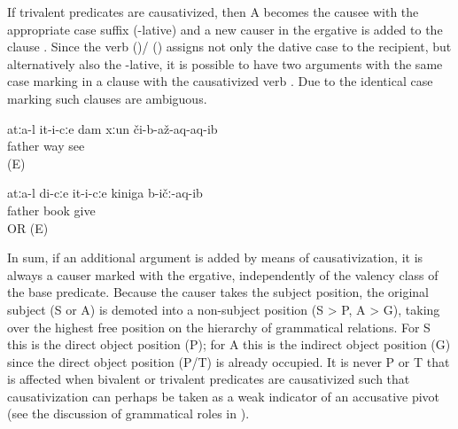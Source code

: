 If trivalent predicates are causativized, then A becomes the causee with the appropriate case suffix (-lative) and a new causer in the ergative is added to the clause . Since the verb  ()\slash{} ()  assigns not only the dative case to the recipient, but alternatively also the -lative, it is possible to have two arguments with the same case marking in a clause with the causativized verb  . Due to the identical case marking such clauses are ambiguous.
%
\begin{exe}
	\ex	\label{ex:Father made him show me the way@61}
	\gll	atːa-l	it-i-cːe	dam	xːun	či-b-až-aq-aq-ib\\
		father			way	see\\
	\glt	{} (E)

	\ex	\label{ex:Father made him give me the book}
	\gll	atːa-l	di-cːe	it-i-cːe	kiniga	b-ičː-aq-ib\\
		father			book	give\\
	\glt	{} OR  (E)
\end{exe}

In sum, if an additional argument is added by means of causativization, it is always a causer marked with the ergative, independently of the valency class of the base predicate. Because the causer takes the subject position, the original subject (S or A) is demoted into a non-subject position (S > P, A > G), taking over the highest free position on the hierarchy of grammatical relations. For S this is the direct object position (P); for A this is the indirect object position (G) since the direct object position (P/T) is already occupied. It is never P or T that is affected when bivalent or trivalent predicates are causativized such that causativization can perhaps be taken as a weak indicator of an accusative pivot (see the discussion of grammatical roles in ).

